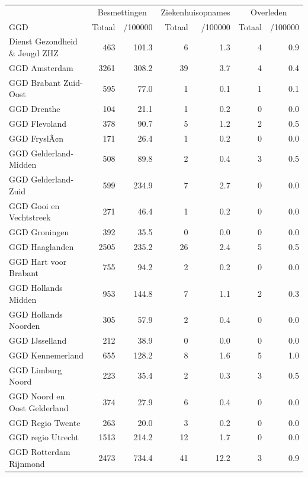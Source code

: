 \documentclass[
  english,
  man,floatsintext]{apa6}
\begin{document}
\begin{table}[H]
\centering\begingroup\fontsize{10}{12}\selectfont

\begin{threeparttable}
\begin{tabular}{lrrrrrr}
\toprule
\multicolumn{1}{c}{ } & \multicolumn{2}{c}{Besmettingen} & \multicolumn{2}{c}{Ziekenhuisopnames} & \multicolumn{2}{c}{Overleden} \\
\cmidrule(l{3pt}r{3pt}){2-3} \cmidrule(l{3pt}r{3pt}){4-5} \cmidrule(l{3pt}r{3pt}){6-7}
GGD & Totaal & /100000 & Totaal & /100000 & Totaal & /100000\\
\midrule
Dienst Gezondheid \& Jeugd ZHZ & 463 & 101.3 & 6 & 1.3 & 4 & 0.9\\
GGD Amsterdam & 3261 & 308.2 & 39 & 3.7 & 4 & 0.4\\
GGD Brabant Zuid-Oost & 595 & 77.0 & 1 & 0.1 & 1 & 0.1\\
GGD Drenthe & 104 & 21.1 & 1 & 0.2 & 0 & 0.0\\
GGD Flevoland & 378 & 90.7 & 5 & 1.2 & 2 & 0.5\\
GGD FryslÃ¢n & 171 & 26.4 & 1 & 0.2 & 0 & 0.0\\
GGD Gelderland-Midden & 508 & 89.8 & 2 & 0.4 & 3 & 0.5\\
GGD Gelderland-Zuid & 599 & 234.9 & 7 & 2.7 & 0 & 0.0\\
GGD Gooi en Vechtstreek & 271 & 46.4 & 1 & 0.2 & 0 & 0.0\\
GGD Groningen & 392 & 35.5 & 0 & 0.0 & 0 & 0.0\\
GGD Haaglanden & 2505 & 235.2 & 26 & 2.4 & 5 & 0.5\\
GGD Hart voor Brabant & 755 & 94.2 & 2 & 0.2 & 0 & 0.0\\
GGD Hollands Midden & 953 & 144.8 & 7 & 1.1 & 2 & 0.3\\
GGD Hollands Noorden & 305 & 57.9 & 2 & 0.4 & 0 & 0.0\\
GGD IJsselland & 212 & 38.9 & 0 & 0.0 & 0 & 0.0\\
GGD Kennemerland & 655 & 128.2 & 8 & 1.6 & 5 & 1.0\\
GGD Limburg Noord & 223 & 35.4 & 2 & 0.3 & 3 & 0.5\\
GGD Noord en Oost Gelderland & 374 & 27.9 & 6 & 0.4 & 0 & 0.0\\
GGD Regio Twente & 263 & 20.0 & 3 & 0.2 & 0 & 0.0\\
GGD regio Utrecht & 1513 & 214.2 & 12 & 1.7 & 0 & 0.0\\
GGD Rotterdam Rijnmond & 2473 & 734.4 & 41 & 12.2 & 3 & 0.9\\

\end{tabular}
\end{threeparttable}
\end{table}
\end{document}
